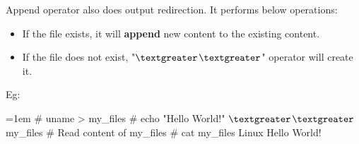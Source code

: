 \setlength{\columnsep}{3pt}
\begin{flushleft}
	Append operator also does output redirection.
	\newline
	It performs below operations:
	\begin{itemize}
		\item If the file exists, it will \textbf{append} new content to the existing content.
		\item If the file does not exist, "\textbf{{$\textgreater$}}\textbf{{$\textgreater$}}" operator will create it.
	\end{itemize}
	Eg:
	\begin{tcolorbox}[breakable,notitle,boxrule=-0pt,colback=black,colframe=black]
	\color{green}
	\font=1em
	\# uname > my\_files 
	\newline
	\# echo "Hello World!" \textbf{{$\textgreater$}}\textbf{{$\textgreater$}} my\_files 			
	\newline
	\newline
	\color{yellow}
	\# Read content of my\_files
	\color{green}
	\newline
	\# cat my\_files    
	\newline
	\color{white}
	Linux 
	\newline
	\color{white}
	Hello World!
	\font=4pt
	\end{tcolorbox}

	
\end{flushleft}

\newpage

